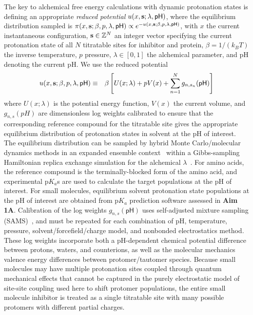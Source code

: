 \documentclass[11pt]{article}
\begin{document}
The key to alchemical free energy calculations with dynamic protonation states is defining an appropriate \emph{reduced potential} $u(x,{\bf s};\lambda,\mathsf{pH})$, where the equilibrium distribution sampled is $\pi(x,{\bf s};\beta, p, \lambda,\mathsf{pH}) \propto e^{-u(x,{\bf s};\beta, p, \lambda,\mathsf{pH})}$, with $x$ the current instantaneous configuration,  ${\bf s} \in \mathbb{Z}^N$ an integer vector specifying the current protonation state of all $N$ titratable sites for inhibitor and protein, $\beta = 1/(k_B T)$ the inverse temperature, $p$ pressure, $\lambda \in [0,1]$ the alchemical parameter, and pH denoting the current pH.
We use the reduced potential
\begin{eqnarray}
u(x,{\bf s};\beta, p, \lambda,\mathsf{pH}) &\equiv& \beta \left[ U(x;\lambda) + p V(x) + \sum_{n=1}^N g_{n,s_n}(\mathsf{pH}) \right]
\end{eqnarray}
where $U(x;\lambda)$ is the potential energy function, $V(x)$ the current volume, and $g_{n,s}(pH)$ are dimensionless log weights calibrated to ensure that the corresponding reference compound for the titratable site gives the appropriate equilibrium distribution of protonation states in solvent at the pH of interest.
The equilibrium distribution can be sampled by hybrid Monte Carlo/molecular dynamics methods in an expanded ensemble context~\cite{lyubartsev:jcp:1992:expanded-ensembles,chodera-shirts:jcp:2011:gibbs,ncmc} within a Gibbs-sampling Hamiltonian replica exchange simulation for the alchemical $\lambda$~\cite{chodera-shirts:jcp:2011:gibbs}.
For amino acids, the reference compound is the terminally-blocked form of the amino acid, and experimental p$K_a$s are used to calculate the target populations at the pH of interest.
For small molecules, equilibrium solvent protonation state populations at the pH of interest are obtained from p$K_a$ prediction software assessed in {\bf Aim 1A}.
Calibration of the log weights $g_{n,s}(\mathsf{pH})$ uses self-adjusted mixture sampling (SAMS)~\cite{tan:j-comp-graph-stat:2016:sams}, and must be repeated for each combination of pH, temperature, pressure, solvent/forcefield/charge model, and nonbonded electrostatics method.
These log weights incorporate both a pH-dependent chemical potential difference between protons, waters, and counterions, as well as the molecular mechanics valence energy differences between protomer/tautomer species.
Because small molecules may have multiple protonation sites coupled through quantum mechanical effects that cannot be captured in the purely electrostatic model of site-site coupling used here to shift protomer populations, the entire small molecule inhibitor is treated as a single titratable site with many possible protomers with different partial charges.
\end{document}
